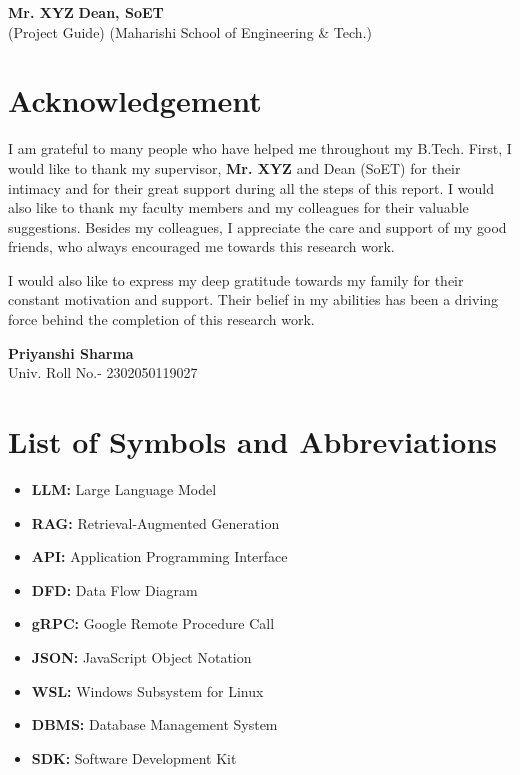\documentclass[12pt, a4paper]{report}
\begin{document}
\vspace{3cm}
\noindent \textbf{Mr. XYZ} \hfill \textbf{Dean, SoET} \\
\noindent (Project Guide) \hfill (Maharishi School of Engineering \& Tech.)

\clearpage

\chapter*{Acknowledgement}
I am grateful to many people who have helped me throughout my B.Tech. First, I would like to thank my supervisor, \textbf{Mr. XYZ} and Dean (SoET) for their intimacy and for their great support during all the steps of this report. I would also like to thank my faculty members and my colleagues for their valuable suggestions. Besides my colleagues, I appreciate the care and support of my good friends, who always encouraged me towards this research work.

I would also like to express my deep gratitude towards my family for their constant motivation and support. Their belief in my abilities has been a driving force behind the completion of this research work.

\vspace{1cm}
\noindent \textbf{Priyanshi Sharma} \\
\noindent Univ. Roll No.- 2302050119027

\clearpage

\tableofcontents
\clearpage
\listoffigures
\clearpage
\listoftables
\clearpage

\chapter*{List of Symbols and Abbreviations}
\begin{itemize}
    \item \textbf{LLM:} Large Language Model
    \item \textbf{RAG:} Retrieval-Augmented Generation
    \item \textbf{API:} Application Programming Interface
    \item \textbf{DFD:} Data Flow Diagram
    \item \textbf{gRPC:} Google Remote Procedure Call
    \item \textbf{JSON:} JavaScript Object Notation
    \item \textbf{WSL:} Windows Subsystem for Linux
    \item \textbf{DBMS:} Database Management System
    \item \textbf{SDK:} Software Development Kit
\end{itemize}
\end{document}
